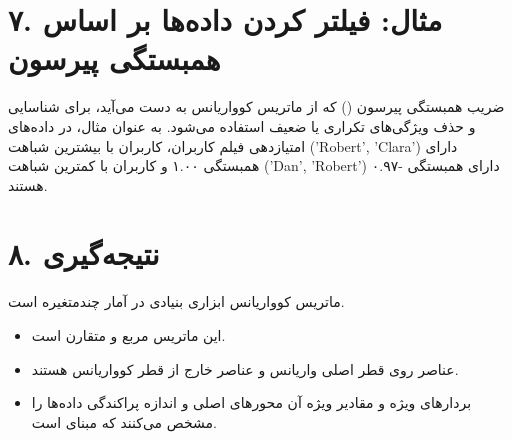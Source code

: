 \documentclass{article}
\begin{document}
\section*{۷. مثال: فیلتر کردن داده‌ها بر اساس همبستگی پیرسون}
ضریب همبستگی پیرسون () که از ماتریس کوواریانس به دست می‌آید، برای شناسایی و حذف ویژگی‌های تکراری یا ضعیف استفاده می‌شود. به عنوان مثال، در داده‌های امتیازدهی فیلم کاربران، کاربران با بیشترین شباهت ('Robert', 'Clara') دارای همبستگی ۱.۰۰ و کاربران با کمترین شباهت ('Dan', 'Robert') دارای همبستگی -۰.۹۷ هستند.

\section*{۸. نتیجه‌گیری}
ماتریس کوواریانس ابزاری بنیادی در آمار چندمتغیره است.
\begin{itemize}
    \item این ماتریس مربع و متقارن است.
    \item عناصر روی قطر اصلی واریانس و عناصر خارج از قطر کوواریانس هستند.
    \item بردارهای ویژه و مقادیر ویژه آن محورهای اصلی و اندازه پراکندگی داده‌ها را مشخص می‌کنند که مبنای  است.
\end{itemize}
\end{document}
